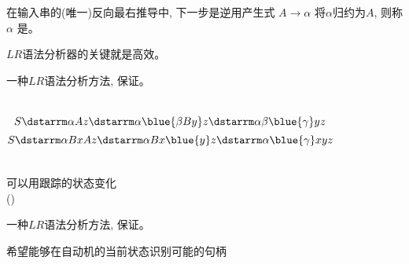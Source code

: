 \begin{frame}{}
  \begin{center}

    \begin{definition}[句柄 (Handle)]
      在输入串的(唯一)反向最右推导中, 下一步是逆用产生式 $A \to \alpha$
      将$\alpha$归约为$A$, 则称 $\alpha$ 是。
    \end{definition}

    \vspace{0.50cm}

    \vspace{0.30cm}
    $LR$语法分析器的关键就是高效。
  \end{center}
\end{frame}

\begin{frame}{}
  \begin{center}

    \begin{theorem}
      一种$LR$语法分析方法, 保证。
    \end{theorem}

    \pause

    \vspace{-0.30cm}
    \begin{columns}
        \[
          S \dstarrm \alpha Az \dstarrm \alpha\blue{\beta By}z
            \dstarrm \alpha\beta\blue{\gamma} yz
        \]
        \[
          S \dstarrm \alpha BxAz \dstarrm \alpha Bx\blue{y}z \dstarrm \alpha\blue{\gamma} xyz
        \]
    \end{columns}
  \end{center}
\end{frame}

\begin{frame}{}
  \begin{center}
    可以用跟踪的状态变化 \\[5pt]
    ()

    \begin{theorem}
      一种$LR$语法分析方法, 保证。
    \end{theorem}

    \pause
    \vspace{0.80cm}
    希望能够在自动机的当前状态识别可能的句柄
  \end{center}
\end{frame}


